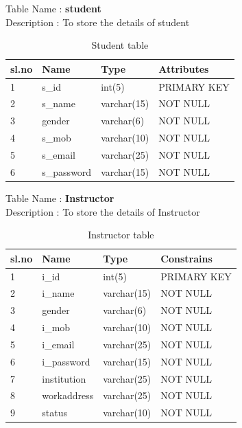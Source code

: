 \begin{table}[!h]
Table Name    :    {\bf student}\\
Description      :  To store the details of student


\begin{tabular}{|l|l|l|l|}
\hline
\bf sl.no & \bf Name        & \bf Type        & \bf Attributes  \\ 
\hline
1     & s\_id       & int(5)      & PRIMARY KEY \\ 
\hline
2     & s\_name     & varchar(15) &      NOT NULL       \\ 
\hline
3     & gender      & varchar(6)  &      NOT NULL       \\ 
\hline
4     & s\_mob      & varchar(10) &     NOT NULL        \\ 
\hline
5     & s\_email    & varchar(25) &       NOT NULL      \\ 
\hline
6     & s\_password & varchar(15) &    NOT NULL         \\ 
\hline
\end{tabular}
\caption{Student table}
\end{table}

\begin{table}[!h]
Table Name    :    {\bf Instructor}\\
Description      :  To store the details of Instructor


\begin{tabular}{|l|l|l|l|}
\hline
\bf sl.no & \bf Name        & \bf Type        & \bf Constrains  \\ 
\hline
1     & i\_id       & int(5)      & PRIMARY KEY \\ 
\hline
2     & i\_name     & varchar(15) &  NOT NULL       \\ 
\hline
3     & gender      & varchar(6)  &      NOT NULL  \\ 
\hline
4     & i\_mob      & varchar(10) &    NOT NULL         \\ 
\hline
5     & i\_email    & varchar(25) &      NOT NULL       \\ 
\hline
6     & i\_password & varchar(15) &    NOT NULL         \\ 
\hline
7     & institution & varchar(25) &      NOT NULL       \\ 
\hline
8     & workaddress & varchar(25) &  NOT NULL           \\ 
\hline
9     & status      & varchar(10) &       NOT NULL      \\ 
\hline
\end{tabular}
\caption{Instructor table}
\end{table}

